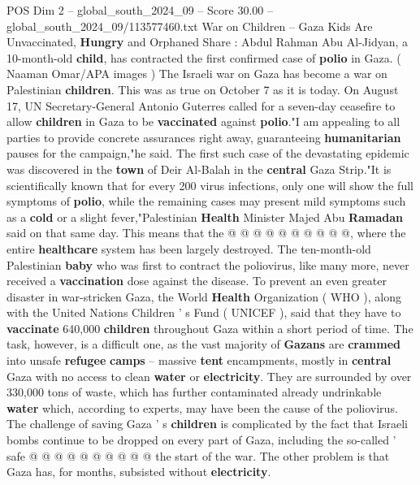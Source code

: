 \begin{textsample}{POS Dim 2 – global\_south\_2024\_09 – Score 30.00 – global\_south\_2024\_09/113577460.txt}  \label{ex:f2_pos_191}
War on Children -- Gaza Kids Are Unvaccinated, \textbf{Hungry} and Orphaned Share : Abdul Rahman Abu Al-Jidyan, a 10-month-old \textbf{child}, has contracted the first confirmed case of \textbf{polio} in Gaza. ( Naaman Omar/APA images ) The Israeli war on Gaza has become a war on Palestinian \textbf{children}.
This was as true on October 7 as it is today.
On August 17, UN Secretary-General Antonio Guterres called for a seven-day ceasefire to allow \textbf{children} in Gaza to be \textbf{vaccinated} against \textbf{polio}."I am appealing to all parties to provide concrete assurances right away, guaranteeing \textbf{humanitarian} pauses for the campaign,"he said.
The first such case of the devastating epidemic was discovered in the \textbf{town} of Deir Al-Balah in the \textbf{central} Gaza Strip."It is scientifically known that for every 200 virus infections, only one will show the full symptoms of \textbf{polio}, while the remaining cases may present mild symptoms such as a \textbf{cold} or a slight fever,"Palestinian \textbf{Health} Minister Majed Abu \textbf{Ramadan} said on that same day.
This means that the @ @ @ @ @ @ @ @ @ @, where the entire \textbf{healthcare} system has been largely destroyed.
The ten-month-old Palestinian \textbf{baby} who was first to contract the poliovirus, like many more, never received a \textbf{vaccination} dose against the disease.
To prevent an even greater disaster in war-stricken Gaza, the World \textbf{Health} Organization ( WHO ), along with the United Nations Children ' s Fund ( UNICEF ), said that they have to \textbf{vaccinate} 640,000 \textbf{children} throughout Gaza within a short period of time.
The task, however, is a difficult one, as the vast majority of \textbf{Gazans} are \textbf{crammed} into unsafe \textbf{refugee} \textbf{camps} -- massive \textbf{tent} encampments, mostly in \textbf{central} Gaza with no access to clean \textbf{water} or \textbf{electricity}.
They are surrounded by over 330,000 tons of waste, which has further contaminated already undrinkable \textbf{water} which, according to experts, may have been the cause of the poliovirus.
The challenge of saving Gaza ' s \textbf{children} is complicated by the fact that Israeli bombs continue to be dropped on every part of Gaza, including the so-called ' safe @ @ @ @ @ @ @ @ @ @ the start of the war.
The other problem is that Gaza has, for months, subsisted without \textbf{electricity}.

\end{textsample}
